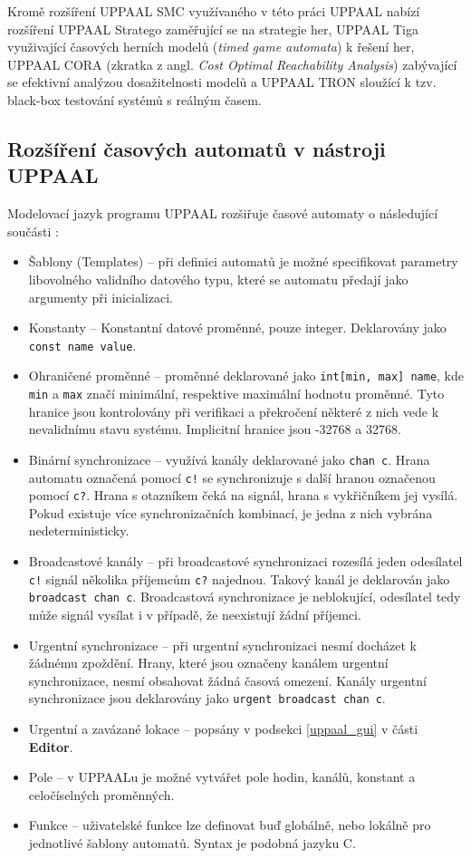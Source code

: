 Kromě rozšíření UPPAAL SMC využívaného v této práci UPPAAL nabízí rozšíření UPPAAL Stratego zaměřující se na strategie her, UPPAAL Tiga využivající časových herních modelů (\textit{timed game automata}) k řešení her, UPPAAL CORA (zkratka z angl. \textit{Cost Optimal Reachability Analysis}) zabývající se efektivní analýzou dosažitelnosti modelů a UPPAAL TRON sloužící k tzv. black-box testování systémů s reálným časem.

\subsection{Rozšíření časových automatů v nástroji UPPAAL}
Modelovací jazyk programu UPPAAL rozšiřuje časové automaty o následující součásti \cite{uppaal_intro}:

\begin{itemize}
    \item Šablony (Templates) -- při definici automatů je možné specifikovat parametry libovolného validního datového typu, které se automatu předají jako argumenty při inicializaci.
    \item Konstanty -- Konstantní datové proměnné, pouze integer. Deklarovány jako \texttt{const name value}.
    \item Ohraničené proměnné -- proměnné deklarované jako \texttt{int[min, max] name}, kde \texttt{min} a \texttt{max} značí minimální, respektive maximální hodnotu proměnné. Tyto hranice jsou kontrolovány při verifikaci a překročení některé z nich vede k nevalidnímu stavu systému. Implicitní hranice jsou -32768 a 32768.
    \item Binární synchronizace -- využívá kanály deklarované jako \texttt{chan c}. Hrana automatu označená pomocí \texttt{c!} se synchronizuje s další hranou označenou pomocí \texttt{c?}. Hrana s otazníkem čeká na signál, hrana s vykřičníkem jej vysílá. Pokud existuje více synchronizačních kombinací, je jedna z nich vybrána nedeterministicky.
    \item Broadcastové kanály -- při broadcastové synchronizaci rozesílá jeden odesílatel \texttt{c!} signál několika příjemcům \texttt{c?} najednou. Takový kanál je deklarován jako \texttt{broadcast chan c}. Broadcastová synchronizace je neblokující, odesílatel tedy může signál vysílat i v případě, že neexistují žádní příjemci.
    \item Urgentní synchronizace -- při urgentní synchronizaci nesmí docházet k žádnému zpoždění. Hrany, které jsou označeny kanálem urgentní synchronizace, nesmí obsahovat žádná časová omezení. Kanály urgentní synchronizace jsou deklarovány jako \texttt{urgent broadcast chan c}.
    \item Urgentní a zavázané lokace -- popsány v podsekci \ref{uppaal_gui} v části \textbf{Editor}.
    \item Pole -- v UPPAALu je možné vytvářet pole hodin, kanálů, konstant a celočíselných proměnných.
    \item Funkce -- uživatelské funkce lze definovat buď globálně, nebo lokálně pro jednotlivé šablony automatů. Syntax je podobná jazyku C.
\end{itemize}


